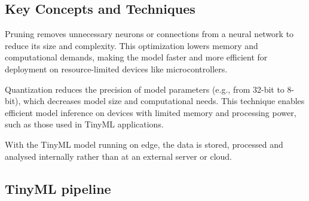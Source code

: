 \documentclass[twocolumn]{article}
\begin{document}
\subsection{Key Concepts and Techniques}

Pruning removes unnecessary neurons or connections from a neural network to reduce its size and complexity. This optimization lowers memory and computational demands, making the model faster and more efficient for deployment on resource-limited devices like microcontrollers.

Quantization reduces the precision of model parameters (e.g., from 32-bit to 8-bit), which decreases model size and computational needs. This technique enables efficient model inference on devices with limited memory and processing power, such as those used in TinyML applications.

With the TinyML model running on edge, the data is stored, processed and analysed internally rather
than at an external server or cloud. 

\subsection{TinyML pipeline}
\end{document}
